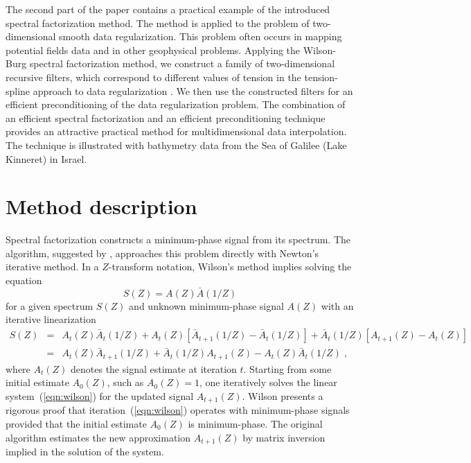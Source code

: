 The second part of the paper contains a practical example of the
introduced spectral factorization method. The method is applied to the
problem of two-dimensional smooth data regularization. This problem
often occurs in mapping potential fields data and in other geophysical
problems. Applying the Wilson-Burg spectral factorization method, we
construct a family of two-dimensional recursive filters, which
correspond to different values of tension in the tension-spline
approach to data regularization \cite{GEO55.03.02930305}. We then use
the constructed filters for an efficient preconditioning of the data
regularization problem. The combination of an efficient spectral factorization
and an efficient preconditioning technique provides an attractive practical
method for multidimensional data interpolation. The technique is illustrated
with bathymetry data from the Sea of Galilee (Lake Kinneret) in Israel.

\section{Method description}

Spectral factorization constructs a minimum-phase signal from its
spectrum.  The algorithm, suggested by , approaches
this problem directly with Newton's iterative method. In a
$Z$-transform notation, Wilson's method implies solving the equation
\begin{equation}
S(Z) = A(Z)\bar{A}(1/Z)
\label{eqn:specfac}
\end{equation}
for a given spectrum $S(Z)$ and unknown minimum-phase signal $A(Z)$
with an iterative linearization
\begin{eqnarray}
\nonumber
S(Z) & = & A_t(Z)\bar A_t(1/Z)+
     A_t(  Z)[\bar A_{t+1}(1/Z)-\bar A_t(1/Z)]+
\bar A_t(1/Z)[     A_{t+1}(  Z)-     A_t(  Z)] \\
& = & A_t(  Z) \bar A_{t+1}(1/Z) + \bar A_t(1/Z) A_{t+1}(Z)
- A_t(Z)\bar A_t(1/Z)
\;,
\label{eqn:wilson}
\end{eqnarray}
where $A_t(Z)$ denotes the signal estimate at iteration $t$. Starting from
some initial estimate $A_0(Z)$, such as $A_0(Z)=1$, one iteratively solves the
linear system~(\ref{eqn:wilson}) for the updated signal $A_{t+1}(Z)$. Wilson
 presents a rigorous proof that
iteration~(\ref{eqn:wilson}) operates with minimum-phase signals provided that
the initial estimate $A_0(Z)$ is minimum-phase. The original algorithm
estimates the new approximation $A_{t+1}(Z)$ by matrix inversion implied in
the solution of the system.

